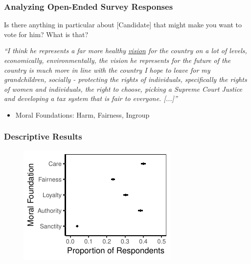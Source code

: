 \begin{frame}%
  \frametitle{Analyzing Open-Ended Survey Responses}
\begin{exampleblock}{Is there anything in particular about [Candidate] that might make you want to vote for him? What is that?}
  \begin{center}
    \textit{``I think he represents a far more healthy \underline{vision} for the country on a lot of levels, economically, environmentally, the vision he represents for the future of the country is much more in line with the country I hope to leave for my grandchildren, socially - {\color{blue}protecting} the {\color{green}rights} of {\color{red}individuals}, specifically the {\color{green}rights} of women and {\color{red}individuals}, the right to choose, picking a Supreme Court {\color{green}Justice} and developing a tax system that is {\color{green}fair} to everyone. [...]''}
  \end{center}
\end{exampleblock}
  \begin{itemize}
  \item Moral Foundations: {\color{blue}Harm}, {\color{green}Fairness}, {\color{red}Ingroup}
  \end{itemize}
\end{frame}


\begin{frame}%
  \frametitle{Descriptive Results}
  \begin{figure}[ht]\centering
    \includegraphics[height=.8\textheight]{fig/prop_mft}
  \end{figure}
\end{frame}


